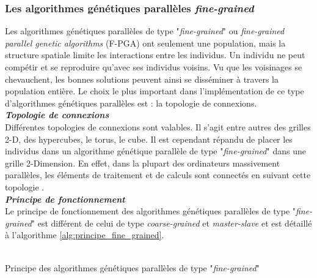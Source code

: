 	\subsubsection{Les algorithmes génétiques parallèles \emph{fine-grained}}
	
	Les algorithmes génétiques parallèles de type "\emph{fine-grained}" ou \emph{fine-grained parallel genetic algorithms} (F-PGA) ont seulement une population, mais la structure spatiale limite les interactions entre les individus. Un individu ne peut compétir et se reproduire qu'avec ses individus voisins. Vu que les voisinages se chevauchent, les bonnes solutions peuvent ainsi se disséminer à travers la population entière. Le choix le plus important dans l'implémentation de ce type d'algorithmes génétiques parallèles est : la topologie de connexions.\\
	
	\textsl{\textbf{Topologie de connexions}}\\
	\hspace*{.5cm}Différentes topologies de connexions sont valables. Il s'agit entre autres des grilles 2-D, des hypercubes, le torus, le cube. Il est cependant répandu de placer les individus dans un algorithme génétique parallèle de type "\emph{fine-grained}" dans une grille 2-Dimension. En effet, dans la plupart des ordinateurs massivement parallèles, les éléments de traitement et de calculs sont connectés en suivant cette topologie \cite{cant2}.\\
	
	\textsl{\textbf{Principe de fonctionnement}}\\
	\hspace*{.5cm}Le principe de fonctionnement des algorithmes génétiques parallèles de type "\emph{fine-grained}" est différent de celui de type \emph{coarse-grained} et \emph{master-slave} et est détaillé à l'algorithme \ref{alg:principe_fine_grained}. \\
	\\
	\begin{algorithm}[H]
 		\caption{Principe des algorithmes génétiques parallèles de type "\emph{fine-grained}" \cite{nayak}}
 		\label{alg:principe_fine_grained}
 		\BlankLine
 		\BlankLine
	\end{algorithm}
	
